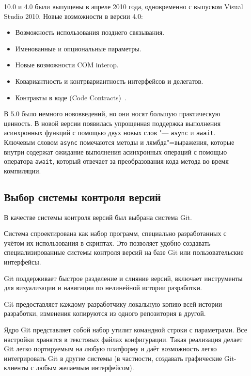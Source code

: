 \vbnet{} 10.0 и \csharp{} 4.0 были выпущены в апреле 2010 года, одновременно с выпуском Visual Studio 2010.
Новые возможности в версии 4.0:
\begin{itemize}
  \item Возможность использования позднего связывания.
  \item Именованные и опциональные параметры.
  \item Новые возможности COM interop.
  \item Ковариантность и контрвариантность интерфейсов и делегатов.
  \item Контракты в коде (Code Contracts)~\cite{csharp_wiki_2013_ru}.
\end{itemize}

В \csharp{} 5.0 было немного нововведений, но они носят большую практическую ценность.
В новой версии появилась упрощенная поддержка выполнения асинхронных функций с помощью двух новых слов "---  \lstinline[style=csharpinlinestyle]!async! и \lstinline[style=csharpinlinestyle]!await!.
Ключевым словом \lstinline[style=csharpinlinestyle]!async! помечаются методы и лямбда"=выражения, которые внутри содержат ожидание выполнения асинхронных операций с помощью оператора \lstinline[style=csharpinlinestyle]!await!, который отвечает за преобразования кода метода во время компиляции.


\subsection{Выбор системы контроля версий }
\label{sub:practice:git}
 
В качестве системы контроля версий был выбрана система Git.

Система спроектирована как набор программ, специально разработанных с учётом их использования в скриптах. Это позволяет удобно создавать специализированные системы контроля версий на базе Git или пользовательские интерфейсы.

Git поддерживает быстрое разделение и слияние версий, включает инструменты для визуализации и навигации по нелинейной истории разработки. 

Git предоставляет каждому разработчику локальную копию всей истории разработки, изменения копируются из одного репозитория в другой.

Ядро Git представляет собой набор утилит командной строки с параметрами. Все настройки хранятся в текстовых файлах конфигурации. Такая реализация делает Git легко портируемым на любую платформу и даёт возможность легко интегрировать Git в другие системы (в частности, создавать графические Git-клиенты с любым желаемым интерфейсом).

